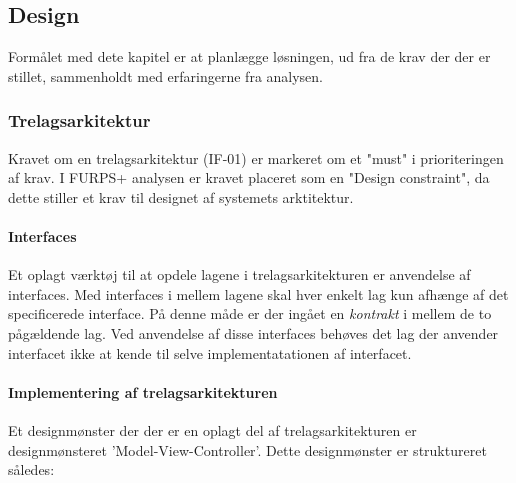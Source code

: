 \subsection{Design}

Formålet med dete kapitel er at planlægge løsningen, ud fra de krav der der er
stillet, sammenholdt med erfaringerne fra analysen.


\subsubsection{Trelagsarkitektur}%
\label{ssub:3_lags_arkiteturen}

Kravet om en trelagsarkitektur (IF-01) er markeret om et "must" i prioriteringen af
krav. I FURPS+ analysen er kravet placeret som en "Design constraint", da dette
stiller et krav til designet af systemets arktitektur. 


\paragraph{Interfaces} Et oplagt værktøj til at opdele lagene i
trelagsarkitekturen er anvendelse af interfaces. Med interfaces i mellem lagene 
skal hver enkelt lag kun afhænge af det specificerede interface. På denne måde
er der ingået en \emph{kontrakt} i mellem de to pågældende lag.
Ved anvendelse af disse interfaces behøves det lag der anvender interfacet ikke
at kende til selve implementatationen af interfacet.

\paragraph{Implementering af trelagsarkitekturen}%
\label{par:implementering_af_trelagsarkitekturen}

Et designmønster der der er en oplagt del af trelagsarkitekturen er
designmønsteret 'Model-View-Controller'. Dette designmønster er struktureret
således:

